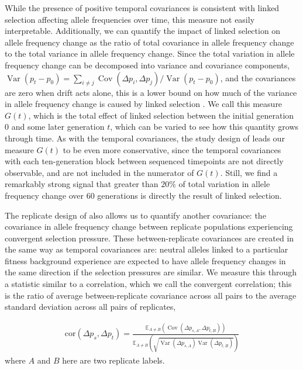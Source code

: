 \documentclass[11pt]{article}
\newcommand{\E}{\mathbb{E}}
\DeclareMathOperator{\var}{Var}
\DeclareMathOperator{\cov}{Cov}
\begin{document}
While the presence of positive temporal covariances is consistent with linked
selection affecting allele frequencies over time, this measure not easily
interpretable. Additionally, we can quantify the impact of linked selection on
allele frequency change as the ratio of total covariance in allele frequency
change to the total variance in allele frequency change. Since the total
variation in allele frequency change can be decomposed into variance and
covariance components, $\var(p_t - p_0) = \sum_{i \ne j} \cov(\Delta p_i,
\Delta p_j) / \var(p_t - p_0)$, and the covariances are zero when drift acts
alone, this is a lower bound on how much of the variance in allele frequency
change is caused by linked selection \parencite{Buffalo2019-io}. We call this
measure $G(t)$, which is the total effect of linked selection between the
initial generation $0$ and some later generation $t$, which can be varied to
see how this quantity grows through time. As with the temporal covariances, the
study design of \textcite{Barghi2019} leads our measure $G(t)$ to be even more
conservative, since the temporal covariances with each ten-generation block
between sequenced timepoints are not directly observable, and are not included
in the numerator of $G(t)$. Still, we find a remarkably strong signal that
greater than $20\%$ of total variation in allele frequency change over 60
generations is directly the result of linked selection.


The replicate design of \textcite{Barghi2019-qy} also allows us to quantify
another covariance: the covariance in allele frequency change between replicate
populations experiencing convergent selection pressure. These between-replicate
covariances are created in the same way as temporal covariances are: neutral
alleles linked to a particular fitness background experience are expected to
have allele frequency changes in the same direction if the selection pressures
are similar. We measure this through a statistic similar to a correlation,
which we call the convergent correlation; this is the ratio of average
between-replicate covariance across all pairs to the average standard deviation
across all pairs of replicates, 

\begin{align}
  \mathrm{cor}(\Delta p_s, \Delta p_t) = \frac{\E_{A\ne B} \left( \cov(\Delta p_{s,A}, \Delta p_{t,B}) \right)}{\E_{A\ne B} \left( \sqrt{\var(\Delta p_{s,A}) \var(\Delta p_{t,B})} \right)}
\end{align}
%
where $A$ and $B$ here are two replicate labels.
\end{document}
